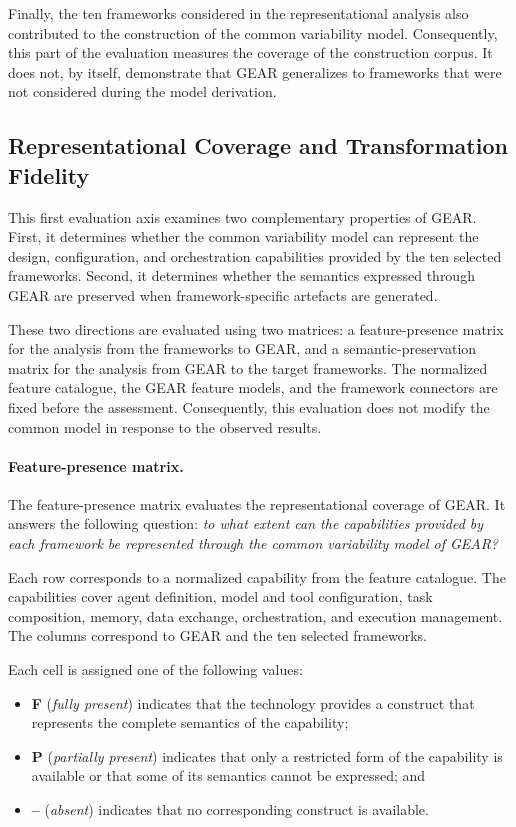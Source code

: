 Finally, the ten frameworks considered in the representational analysis also
contributed to the construction of the common variability model. Consequently,
this part of the evaluation measures the coverage of the construction corpus. It
does not, by itself, demonstrate that GEAR generalizes to frameworks that were not
considered during the model derivation.

\subsection{Representational Coverage and Transformation Fidelity}
\label{subsec:representation-transformation}

This first evaluation axis examines two complementary properties of GEAR.
First, it determines whether the common variability model can represent the
design, configuration, and orchestration capabilities provided by the ten
selected frameworks. Second, it determines whether the semantics expressed
through GEAR are preserved when framework-specific artefacts are generated.

These two directions are evaluated using two matrices: a feature-presence
matrix for the analysis from the frameworks to GEAR, and a
semantic-preservation matrix for the analysis from GEAR to the target
frameworks. The normalized feature catalogue, the GEAR feature models, and
the framework connectors are fixed before the assessment. Consequently, this
evaluation does not modify the common model in response to the observed
results.

\paragraph{Feature-presence matrix.}

The feature-presence matrix evaluates the representational coverage of GEAR.
It answers the following question: \emph{to what extent can the capabilities
provided by each framework be represented through the common variability
model of GEAR?}

Each row corresponds to a normalized capability from the feature catalogue.
The capabilities cover agent definition, model and tool configuration, task
composition, memory, data exchange, orchestration, and execution management.
The columns correspond to GEAR and the ten selected frameworks.

Each cell is assigned one of the following values:

\begin{itemize}
    \item \textbf{F} (\emph{fully present}) indicates that the technology
    provides a construct that represents the complete semantics of the
    capability;
    
    \item \textbf{P} (\emph{partially present}) indicates that only a
    restricted form of the capability is available or that some of its
    semantics cannot be expressed; and
    
    \item \textbf{--} (\emph{absent}) indicates that no corresponding
    construct is available.
\end{itemize}

